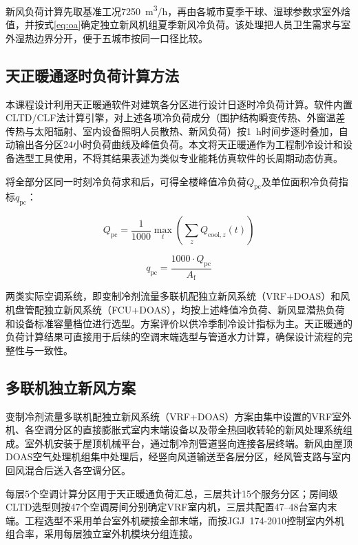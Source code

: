 新风负荷计算先取基准工况\SI{7250}{m^3/h}，再由各城市夏季干球、湿球参数求室外焓值，并按式\ref{eq:oa}确定独立新风机组夏季新风冷负荷。该处理把人员卫生需求与室外湿热边界分开，便于五城市按同一口径比较。
\subsection{天正暖通逐时负荷计算方法}

本课程设计利用天正暖通软件对建筑各分区进行设计日逐时冷负荷计算。软件内置CLTD/CLF法计算引擎，对上述各项冷负荷成分（围护结构瞬变传热、外窗温差传热与太阳辐射、室内设备照明人员散热、新风负荷）按\SI{1}{\hour}时间步逐时叠加，自动输出各分区24小时负荷曲线及峰值负荷\cite{wu2019china_cooling_load}。本文将天正暖通作为工程制冷设计和设备选型工具使用，不将其结果表述为类似专业能耗仿真软件的长周期动态仿真。

将全部分区同一时刻冷负荷求和后，可得全楼峰值冷负荷$Q_{\mathrm{pc}}$及单位面积冷负荷指标$q_{\mathrm{pc}}$：

\begin{equation}
Q_{\mathrm{pc}}=\frac{1}{1000}\max_t\left(\sum_z Q_{\mathrm{cool},z}(t)\right)
\label{eq:Qpc}
\end{equation}

\begin{equation}
q_{\mathrm{pc}}=\frac{1000\cdot Q_{\mathrm{pc}}}{A_{\mathrm{f}}}
\label{eq:qpc}
\end{equation}

两类实际空调系统，即变制冷剂流量多联机配独立新风系统（VRF+DOAS）和风机盘管配独立新风系统（FCU+DOAS），均按上述峰值冷负荷、新风显潜热负荷和设备标准容量档位进行选型。方案评价以供冷季制冷设计指标为主。天正暖通的负荷计算结果可直接用于后续的空调末端选型与管道水力计算，确保设计流程的完整性与一致性。

\subsection{多联机独立新风方案}

变制冷剂流量多联机配独立新风系统（VRF+DOAS）方案由集中设置的VRF室外机、各空调分区的直接膨胀式室内末端设备以及带全热回收转轮的新风处理系统组成\cite{aynur2010vrf_desiccant,kanisanchez2017vrf_whole_building}。室外机安装于屋顶机械平台，通过制冷剂管道竖向连接各层终端。新风由屋顶DOAS空气处理机组集中处理后，经竖向风道输送至各层分区，经风管支路与室内回风混合后送入各空调分区。

每层5个空调计算分区用于天正暖通负荷汇总，三层共计15个服务分区；房间级CLTD选型则按47个空调房间分别确定VRF室内机，三层共配置47--48台室内末端。工程选型不采用单台室外机硬接全部末端，而按JGJ~174-2010控制室内外机组合率，采用每层独立室外机模块分组连接。

